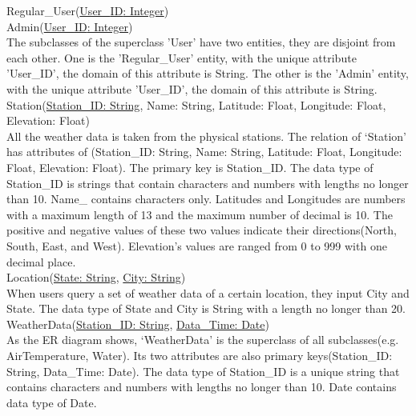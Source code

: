 \documentclass[]{article}
\begin{document}
	\noindent Regular\_User(\uline{User\_{ID}: Integer}) \\
	
	\noindent Admin(\uline{User\_{ID}: Integer}) \\
	
	\noindent The subclasses of the superclass 'User' have two entities, they are disjoint from each other. One is the 'Regular\_User' entity, with the unique attribute 'User\_ID', the domain of this attribute is String. The other is the 'Admin' entity, with the unique attribute 'User\_ID', the domain of this attribute is String.    \\
	
	\noindent Station(\uline{Station\_ID: String}, Name: String, Latitude: Float, Longitude: Float, Elevation: Float)  \\
	
	\noindent All the weather data is taken from the physical stations. The relation of ‘Station’ has attributes of (Station\_ID: String, Name: String, Latitude: Float, Longitude: Float, Elevation: Float). The primary key is Station\_ID. The data type of Station\_ID is strings that contain characters and numbers with lengths no longer than 10. Name\_ contains characters only. Latitudes and Longitudes are numbers with a maximum length of 13 and the maximum number of decimal is 10. The positive and negative values of these two values indicate their directions(North, South, East, and West). Elevation’s values are ranged from 0 to 999 with one decimal place.  \\
	
	\noindent Location(\uline{State: String}, \uline{City: String})  \\
	
	\noindent When users query a set of weather data of a certain location, they input City and State. The data type of State and City is String with a length no longer than 20.   \\
	
	\noindent WeatherData(\uline{Station\_ID: String}, \uline{Data\_Time: Date})   \\
	
	\noindent As the ER diagram shows, ‘WeatherData’ is the superclass of all subclasses(e.g. AirTemperature, Water). Its two attributes are also primary keys(Station\_ID: String, Data\_Time: Date). The data type of Station\_ID is a unique string that contains characters and numbers with lengths no longer than 10. Date contains data type of Date.    \\
	
\end{document}
